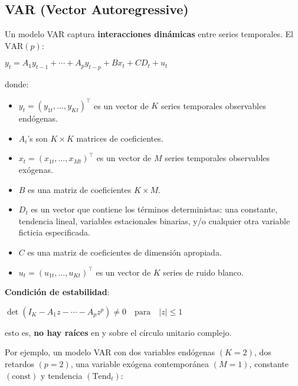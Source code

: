\documentclass[10pt, a4paper, landscape]{article}
\newcommand{\trend}{\text{Tend}_{t}}
\newcommand{\const}{\text{const}}
\begin{document}
\begin{multicols}{2}

\section*{VAR (Vector Autoregressive)}

Un modelo VAR captura \textbf{interacciones dinámicas} entre series temporales. El \( \text{VAR}(p) \):

\begin{center}
	\( y_{t} = A_{1} y_{t - 1} + \cdots + A_{p} y_{t - p} + B x_{t} + CD_{t} + u_{t} \)
\end{center}

donde:

\begin{itemize}[leftmargin=*]
	\item \( y_{t} = (y_{1t}, \ldots, y_{Kt})^{\top} \) es un vector de \( K \) series temporales observables endógenas.
	\item \( A_{i} \)'s son \( K \times K \) matrices de coeficientes.
	\item \( x_{t} = (x_{1t}, \ldots, x_{Mt})^{\top} \) es un vector de \( M \) series temporales observables exógenas.
	\item \( B \) es una matriz de coeficientes \( K \times M \).
	\item \( D_{t} \) es un vector que contiene los términos deterministas: una constante, tendencia lineal, variables estacionales binarias, y/o cualquier otra variable ficticia especificada.
	\item \( C \) es una matriz de coeficientes de dimensión apropiada.
	\item \( u_{t} = (u_{1t}, \ldots, u_{Kt})^{\top} \) es un vector de \( K \) series de ruido blanco.
\end{itemize}

\textbf{Condición de estabilidad}:

\begin{center}
	\( \det(I_{K} - A_{1} z - \cdots - A_{p} z^{p}) \neq 0 \quad \text{para}\quad \lvert z \rvert \leq 1 \)
\end{center}

\quad esto es, \textbf{no hay raíces} en y sobre el círculo unitario complejo.

Por ejemplo, un modelo VAR con dos variables endógenas \( (K = 2) \), dos retardos \( (p = 2) \), una variable exógena contemporánea \( (M = 1) \), constante \( (\const) \) y tendencia \( (\trend) \):


\end{multicols}
\end{document}
